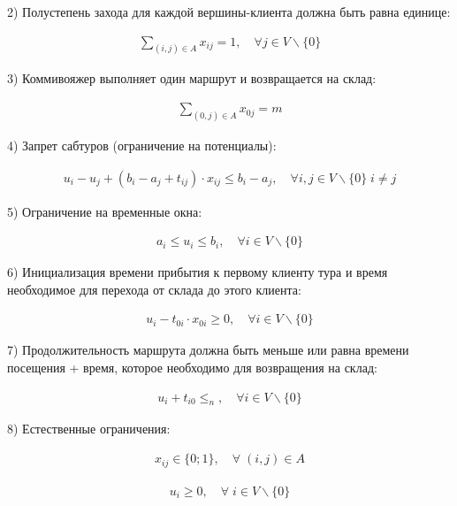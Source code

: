 \documentclass[14pt,fleqn]{extarticle}
\begin{document}
	2) Полустепень захода для каждой вершины-клиента должна быть равна единице:
	
	\begin{ceqn}
		\begin{align*}
			\sum_{(i,j) \in A} x_{ij} = 1, \quad \forall j \in V\backslash\{0\}
		\end{align*}
	\end{ceqn}
	
	3) Коммивояжер выполняет один маршрут и возвращается на склад:
	
	\begin{ceqn}
		\begin{align*}
			\sum_{(0,j) \in A} x_{0j} = m
		\end{align*}
	\end{ceqn}
	
	4) Запрет сабтуров (ограничение на потенциалы):
	
	\begin{ceqn}
		\begin{align*}
			u_i - u_j + (b_i - a_j + t_{ij}) \cdot x_{ij} \leq b_i - a_j, \quad \forall i, j \in V\backslash\{0\} \; i \neq j
		\end{align*}
	\end{ceqn}
	
	\newpage
	
	5) Ограничение на временные окна:
	
	\begin{ceqn}
		\begin{align*}
			a_i \leq u_i \leq b_i, \quad \forall i \in V\backslash\{0\}
		\end{align*}
	\end{ceqn}

	6) Инициализация времени прибытия к первому клиенту тура и время необходимое для перехода от склада до этого клиента:

	\begin{ceqn}
		\begin{align*}
			u_i - t_{0i} \cdot x_{0i} \geq 0, \quad \forall i \in V\backslash\{0\}
		\end{align*}
	\end{ceqn}

	7) Продолжительность маршрута должна быть меньше или равна времени посещения + время, которое необходимо для возвращения на склад:
	
	\begin{ceqn}
		\begin{align*}
			u_i + t_{i0} \leq _n, \quad \forall i \in V\backslash\{0\}
		\end{align*}
	\end{ceqn}
	
	8) Естественные ограничения:
	\begin{ceqn}
		\begin{align*}
			x_{ij} \in \{0;1\}, \quad \forall \; (i,j) \in A
		\end{align*}
	\end{ceqn}
	
	\begin{ceqn}
		\begin{align*}
			u_i \geq 0, \quad \forall \; i \in V\backslash\{0\}
		\end{align*}
	\end{ceqn}
\end{document}

